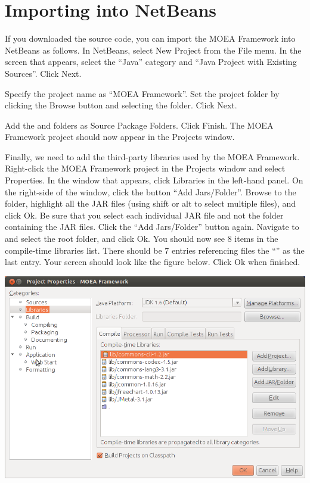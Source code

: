 \section{Importing into NetBeans}
If you downloaded the source code, you can import the MOEA Framework into NetBeans as follows.  In NetBeans, select New Project from the File menu.  In the screen that appears, select the ``Java'' category and ``Java Project with Existing Sources''.  Click Next.

Specify the project name as ``MOEA Framework''.  Set the project folder by clicking the Browse button and selecting the \folder{\moeaframework} folder.  Click Next.

Add the  and  folders as Source Package Folders.  Click Finish.  The MOEA Framework project should now appear in the Projects window.

Finally, we need to add the third-party libraries used by the MOEA Framework.  Right-click the MOEA Framework project in the Projects window and select Properties.  In the window that appears, click Libraries in the left-hand panel.  On the right-side of the window, click the button ``Add Jars/Folder''.  Browse to the  folder, highlight all the JAR files (using shift or alt to select multiple files), and click Ok.  Be sure that you select each individual JAR file and not the folder containing the JAR files.  Click the ``Add Jars/Folder'' button again.  Navigate to and select the root \folder{\moeaframework} folder, and click Ok.  You should now see $8$ items in the compile-time libraries list.  There should be $7$ entries referencing  files the ``'' as the last entry.  Your screen should look like the figure below.  Click Ok when finished.

\begin{center}
  \includegraphics[width=.6\linewidth]{netbeans.png}
\end{center}

